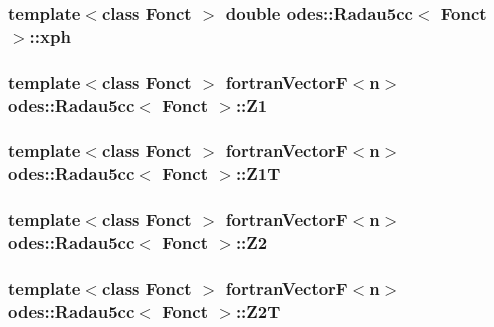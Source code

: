 \subsubsection[{xph}]{\setlength{\rightskip}{0pt plus 5cm}template$<$class Fonct $>$ double {\bf odes\+::\+Radau5cc}$<$ Fonct $>$\+::xph\hspace{0.3cm}{\ttfamily [private]}}\label{classodes_1_1Radau5cc_a9f9ba87113cef033764f5282f987a832}
\hypertarget{classodes_1_1Radau5cc_af04c79b433c9fabdf12fe44a52158a67}{}
\subsubsection[{Z1}]{\setlength{\rightskip}{0pt plus 5cm}template$<$class Fonct $>$ {\bf fortran\+Vector\+F}$<${\bf n}$>$ {\bf odes\+::\+Radau5cc}$<$ Fonct $>$\+::Z1\hspace{0.3cm}{\ttfamily [protected]}}\label{classodes_1_1Radau5cc_af04c79b433c9fabdf12fe44a52158a67}
\hypertarget{classodes_1_1Radau5cc_a596f99b5ee176439461a9e72da725c59}{}
\subsubsection[{Z1\+T}]{\setlength{\rightskip}{0pt plus 5cm}template$<$class Fonct $>$ {\bf fortran\+Vector\+F}$<${\bf n}$>$ {\bf odes\+::\+Radau5cc}$<$ Fonct $>$\+::Z1\+T\hspace{0.3cm}{\ttfamily [protected]}}\label{classodes_1_1Radau5cc_a596f99b5ee176439461a9e72da725c59}
\hypertarget{classodes_1_1Radau5cc_aee840f9b8646bc3a0660c3c53ab7c988}{}
\subsubsection[{Z2}]{\setlength{\rightskip}{0pt plus 5cm}template$<$class Fonct $>$ {\bf fortran\+Vector\+F}$<${\bf n}$>$ {\bf odes\+::\+Radau5cc}$<$ Fonct $>$\+::Z2\hspace{0.3cm}{\ttfamily [protected]}}\label{classodes_1_1Radau5cc_aee840f9b8646bc3a0660c3c53ab7c988}
\hypertarget{classodes_1_1Radau5cc_a4b4c5fa798698101e62b0180acd9d2a0}{}
\subsubsection[{Z2\+T}]{\setlength{\rightskip}{0pt plus 5cm}template$<$class Fonct $>$ {\bf fortran\+Vector\+F}$<${\bf n}$>$ {\bf odes\+::\+Radau5cc}$<$ Fonct $>$\+::Z2\+T\hspace{0.3cm}{\ttfamily [protected]}}\label{classodes_1_1Radau5cc_a4b4c5fa798698101e62b0180acd9d2a0}
\hypertarget{classodes_1_1Radau5cc_a5b34e13256e93e89d9e8e5a9d00c9431}{}
